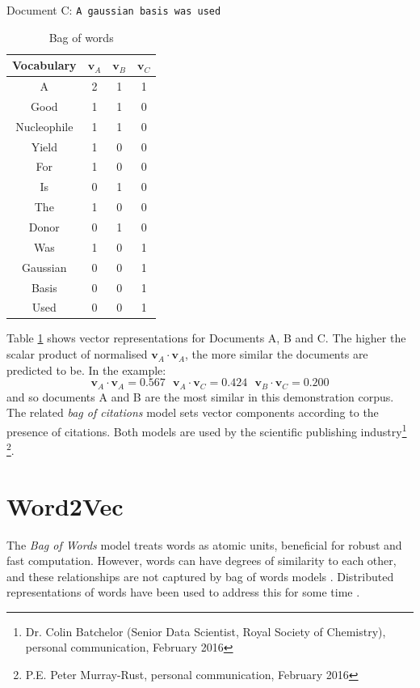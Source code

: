 Document C: \texttt{A gaussian basis was used}
\begin{table}[H]
\label{tab:BAGOFWORDS}
\caption{Bag of words}
\begin{center}
\begin{tabular}{||c|c|c|c||}
\hline
Vocabulary &  $\mathbf{v}_A$ & $\mathbf{v}_B$ & $\mathbf{v}_C$\\
\hline
A & 2 & 1 & 1\\
Good & 1 & 1 & 0\\
Nucleophile & 1 & 1 & 0 \\
Yield & 1 & 0 & 0\\
For & 1& 0 & 0\\
Is & 0 & 1 & 0\\
The & 1 & 0 & 0\\
Donor & 0 & 1 & 0\\
Was & 1 & 0 & 1\\
Gaussian & 0 & 0 & 1\\
Basis & 0 & 0 & 1\\
Used & 0 & 0 & 1\\
\hline
\end{tabular}
\end{center}
\end{table}
Table \ref{tab:BAGOFWORDS} shows vector representations for Documents A, B and C. The higher the scalar product of normalised $\mathbf{v}_A \cdot \mathbf{v}_A$, the more similar the documents are predicted to be. In the example:
 $$\mathbf{v}_A \cdot \mathbf{v}_A = 0.567 \ \ \ \mathbf{v}_A \cdot \mathbf{v}_C = 0.424 \ \ \ \mathbf{v}_B \cdot \mathbf{v}_C=0.200$$ 
and so documents A and B are the most similar in this demonstration corpus.
The related \emph{bag of citations} model sets vector components according to the presence of citations. Both models are used by the scientific publishing industry\footnote{Dr. Colin Batchelor  (Senior Data Scientist, Royal Society of Chemistry), personal communication, February 2016} \footnote{P.E. Peter Murray-Rust, personal communication, February 2016}.
\section{Word2Vec}
\label{sec:WORD2VEC}
The \emph{Bag of Words} model treats words as atomic units, beneficial for robust and fast computation. However, words can have degrees of similarity to each other, and these relationships are not captured by bag of words models \cite{word2veckingqueen}. Distributed representations of words have been used to address this for some time \cite{distributedrepresentations}.

